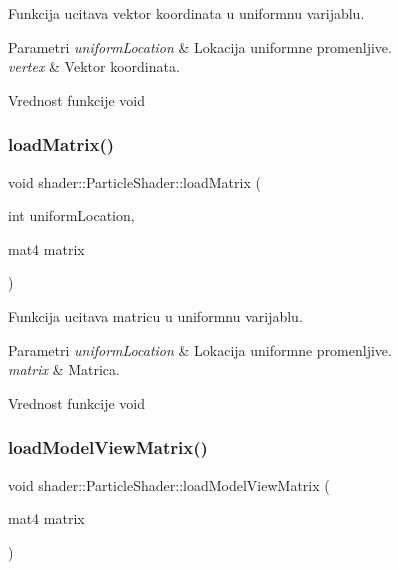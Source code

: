 Funkcija ucitava vektor koordinata u uniformnu varijablu. 


\begin{DoxyParams}{Parametri}
{\em uniform\+Location} & Lokacija uniformne promenljive. \\
\hline
{\em vertex} & Vektor koordinata. \\
\hline
\end{DoxyParams}
\begin{DoxyReturn}{Vrednost funkcije}
void 
\end{DoxyReturn}
\mbox{\label{classshader_1_1ParticleShader_a111c1d93a763340300faa294f6509497}} 
\subsubsection{\texorpdfstring{load\+Matrix()}{loadMatrix()}}
{\footnotesize\ttfamily void shader\+::\+Particle\+Shader\+::load\+Matrix (\begin{DoxyParamCaption}\item[{int}]{uniform\+Location,  }\item[{mat4}]{matrix }\end{DoxyParamCaption})}



Funkcija ucitava matricu u uniformnu varijablu. 


\begin{DoxyParams}{Parametri}
{\em uniform\+Location} & Lokacija uniformne promenljive. \\
\hline
{\em matrix} & Matrica. \\
\hline
\end{DoxyParams}
\begin{DoxyReturn}{Vrednost funkcije}
void 
\end{DoxyReturn}
\mbox{\label{classshader_1_1ParticleShader_a7de43ca31b341d0c5e05dcd7ca6a6390}} 
\subsubsection{\texorpdfstring{load\+Model\+View\+Matrix()}{loadModelViewMatrix()}}
{\footnotesize\ttfamily void shader\+::\+Particle\+Shader\+::load\+Model\+View\+Matrix (\begin{DoxyParamCaption}\item[{mat4}]{matrix }\end{DoxyParamCaption})}



